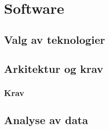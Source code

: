 \section{Software}

\subsection{Valg av teknologier}


\subsection{Arkitektur og krav}
\subsubsection{Krav}

\subsection{Analyse av data}




